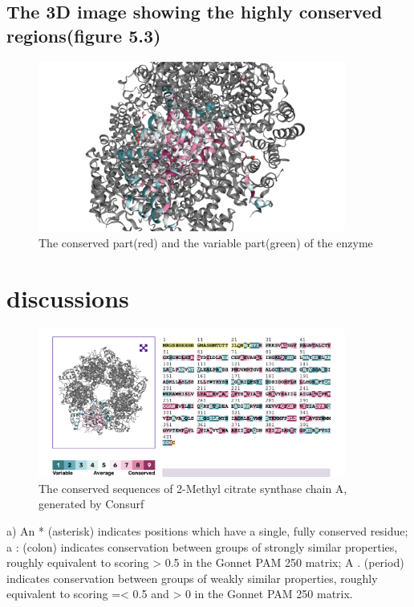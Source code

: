 \documentclass[a4paper,english,12pt,bibliography=totoc]{scrreprt}
\begin{document}
\subsection{The 3D image showing the highly conserved regions(figure 5.3)}

\begin{figure}
    \centering
    \includegraphics[width = 0.9\textwidth]{Project 5/differences/differences.png}
    \caption{The conserved part(red) and the variable part(green) of the enzyme}
\end{figure}

\section{discussions}

\begin{figure}
    \centering
    \includegraphics[width = 0.9\textwidth]{Project 5/Consurf image/consurf.png}
    \caption{The conserved sequences of 2-Methyl citrate synthase chain A, generated by Consurf}
\end{figure}

a) An * (asterisk) indicates positions which have a single, fully conserved residue; a : (colon) indicates conservation between groups of strongly similar properties, roughly equivalent to scoring > 0.5 in the Gonnet PAM 250 matrix; A . (period) indicates conservation between groups of weakly similar properties, roughly equivalent to scoring =< 0.5 and > 0 in the Gonnet PAM 250 matrix.\\%
\end{document}

